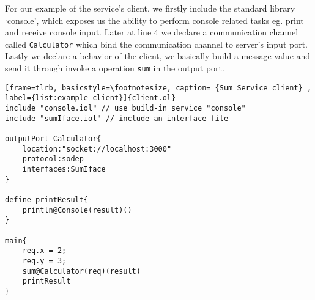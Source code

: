 For our example of the service's client, we firstly include the standard library `console', which exposes us the ability to perform console related tasks eg. print and receive console input. Later at line 4 we declare a communication channel called \texttt{Calculator} which bind the communication channel to server's input port. Lastly we declare a behavior of the client, we basically build a message value and send it through invoke a operation \texttt{sum} in the output port.

\begin{listing}[ht]
    \lstset{language=Jolie,
        style=codeStyle,
        numbers=left,
        firstnumber=1
    }
\begin{lstlisting}[frame=tlrb, basicstyle=\footnotesize, caption= {Sum Service client} , label={list:example-client}]{client.ol}
include "console.iol" // use build-in service "console"
include "sumIface.iol" // include an interface file 

outputPort Calculator{
    location:"socket://localhost:3000"
    protocol:sodep 
    interfaces:SumIface
}

define printResult{
    println@Console(result)()
}

main{
    req.x = 2;
    req.y = 3;
    sum@Calculator(req)(result)
    printResult
}
\end{lstlisting}
\end{listing}

\FloatBarrier
